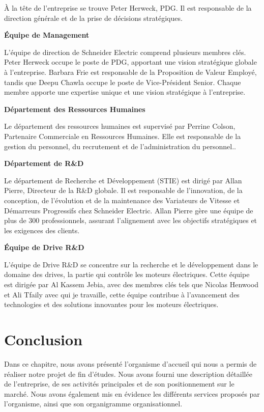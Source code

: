 À la tête de l’entreprise se trouve Peter Herweck, PDG. Il est responsable de la direction générale et de la prise de décisions stratégiques.

\textbf{Équipe de Management}

L'équipe de direction de Schneider Electric comprend plusieurs membres clés.
Peter Herweck occupe le poste de PDG, apportant une vision stratégique globale
à l'entreprise. Barbara Frie est responsable de la Proposition de Valeur
Employé, tandis que Deepu Chawla occupe le poste de Vice-Président Senior.
Chaque membre apporte une expertise unique et une vision stratégique à
l'entreprise.

\textbf{Département des Ressources Humaines}

Le département des ressources humaines est supervisé par Perrine Colson,
Partenaire Commerciale en Ressources Humaines. Elle est responsable de la
gestion du personnel, du recrutement et de l'administration du personnel..

\textbf{Département de R\&D}

Le département de Recherche et Développement (STIE) est dirigé par Allan
Pierre, Directeur de la R\&D globale. Il est responsable de l'innovation, de la
conception, de l'évolution et de la maintenance des Variateurs de Vitesse et
Démarreurs Progressifs chez Schneider Electric. Allan Pierre gère une équipe de
plus de 300 professionnels, assurant l'alignement avec les objectifs
stratégiques et les exigences des clients.

\textbf{Équipe de Drive R\&D}

L’équipe de Drive R\&D se concentre sur la recherche et le développement dans
le domaine des drives, la partie qui contrôle les moteurs électriques. Cette
équipe est dirigée par Al Kassem Jebia, avec des membres clés tels que Nicolas
Henwood et Ali Tfaily avec qui je travaille, cette équipe contribue à
l'avancement des technologies et des solutions innovantes pour les moteurs
électriques.

\section{Conclusion}
Dans ce chapitre, nous avons présenté l’organisme d’accueil qui nous a permis
de réaliser notre projet de fin d’études. Nous avons fourni une description
détaillée de l’entreprise, de ses activités principales et de son
positionnement sur le marché. Nous avons également mis en évidence les
différents services proposés par l’organisme, ainsi que son organigramme
organisationnel.

